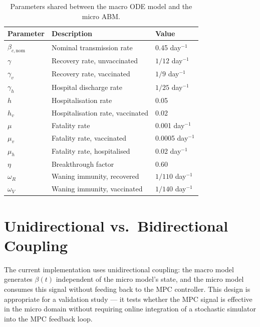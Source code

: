 \begin{table}[ht]
\centering
\caption{Parameters shared between the macro ODE model and the micro ABM.}
\label{tab:shared_params}
\begin{tabular}{@{}lll@{}}
\toprule
\textbf{Parameter} & \textbf{Description} & \textbf{Value} \\
\midrule
$\beta_{c,\mathrm{nom}}$ & Nominal transmission rate & 0.45 day$^{-1}$ \\
$\gamma$    & Recovery rate, unvaccinated  & $1/12$ day$^{-1}$ \\
$\gamma_v$  & Recovery rate, vaccinated    & $1/9$ day$^{-1}$ \\
$\gamma_h$  & Hospital discharge rate      & $1/25$ day$^{-1}$ \\
$h$         & Hospitalisation rate         & 0.05 \\
$h_v$       & Hospitalisation rate, vaccinated & 0.02 \\
$\mu$       & Fatality rate                & 0.001 day$^{-1}$ \\
$\mu_v$     & Fatality rate, vaccinated    & 0.0005 day$^{-1}$ \\
$\mu_h$     & Fatality rate, hospitalised  & 0.02 day$^{-1}$ \\
$\eta$      & Breakthrough factor          & 0.60 \\
$\omega_R$  & Waning immunity, recovered   & $1/110$ day$^{-1}$ \\
$\omega_V$  & Waning immunity, vaccinated  & $1/140$ day$^{-1}$ \\
\bottomrule
\end{tabular}
\end{table}

\section{Unidirectional vs.\ Bidirectional Coupling}
\label{sec:coupling}

The current implementation uses unidirectional coupling: the macro model generates $\beta(t)$ independent of the micro model's state, and the micro model consumes this signal without feeding back to the MPC controller.
This design is appropriate for a validation study --- it tests whether the MPC signal is effective in the micro domain without requiring online integration of a stochastic simulator into the MPC feedback loop.

